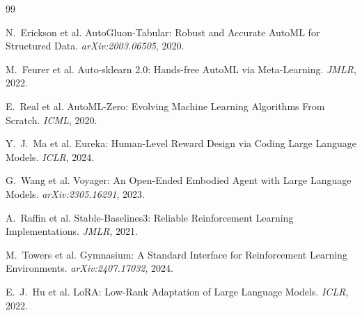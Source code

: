 \documentclass[10pt,twocolumn]{article}
\begin{document}

\begin{thebibliography}{99}

 N.\ Erickson et al. AutoGluon-Tabular: Robust and
Accurate AutoML for Structured Data. \emph{arXiv:2003.06505}, 2020.

 M.\ Feurer et al. Auto-sklearn 2.0: Hands-free
AutoML via Meta-Learning. \emph{JMLR}, 2022.

 E.\ Real et al. AutoML-Zero: Evolving Machine
Learning Algorithms From Scratch. \emph{ICML}, 2020.

 Y.\ J.\ Ma et al. Eureka: Human-Level Reward Design via
Coding Large Language Models. \emph{ICLR}, 2024.

 G.\ Wang et al. Voyager: An Open-Ended Embodied Agent
with Large Language Models. \emph{arXiv:2305.16291}, 2023.

 A.\ Raffin et al. Stable-Baselines3: Reliable Reinforcement
Learning Implementations. \emph{JMLR}, 2021.

 M.\ Towers et al. Gymnasium: A Standard Interface for
Reinforcement Learning Environments. \emph{arXiv:2407.17032}, 2024.

 E.\ J.\ Hu et al. LoRA: Low-Rank Adaptation of Large
Language Models. \emph{ICLR}, 2022.

\end{thebibliography}
\end{document}
